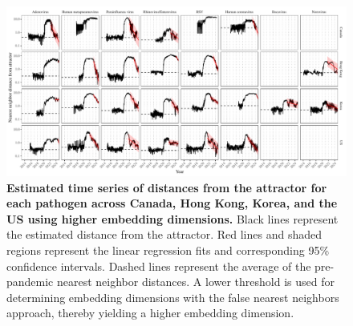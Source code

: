 \documentclass[12pt]{article}
\begin{document}
\pagebreak

\begin{figure}[!th]
\includegraphics[width=\textwidth]{../figure4_th/figure4_dist_th.pdf}
\caption{
\textbf{Estimated time series of distances from the attractor for each pathogen across Canada, Hong Kong, Korea, and the US using higher embedding dimensions.}
Black lines represent the estimated distance from the attractor.
Red lines and shaded regions represent the linear regression fits and corresponding 95\% confidence intervals.
Dashed lines represent the average of the pre-pandemic nearest neighbor distances.
A lower threshold is used for determining embedding dimensions with the false nearest neighbors approach, thereby yielding a higher embedding dimension.
}
\end{figure}

\pagebreak
\end{document}
